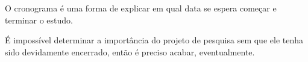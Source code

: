 O cronograma é uma forma de explicar em qual data se espera começar e terminar o estudo.

É impossível determinar a importância do projeto de pesquisa sem que ele tenha sido devidamente encerrado, então é preciso acabar, eventualmente.
